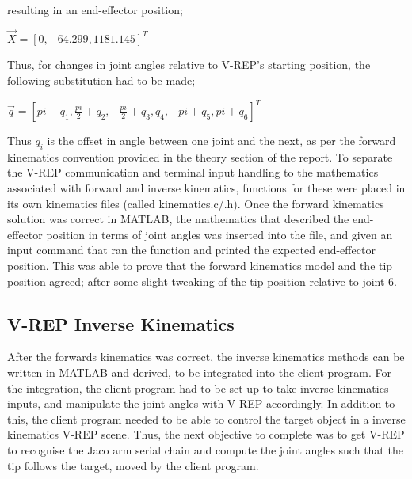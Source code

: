 \documentclass[12pt,openany,a4paper]{book}
\begin{document}
resulting in an end-effector position;

\vspace{\baselineskip}

\begin{center}
$\vec{X} = [0, -64.299, 1181.145]^T$
\end{center}
\vspace{\baselineskip}

Thus, for changes in joint angles relative to V-REP's starting position, the following substitution had to be made;

\vspace{\baselineskip}

\begin{center}
$\vec{q} = [ pi - q_1, \frac{pi}{2} + q_2, -\frac{pi}{2} + q_3, q_4, -pi + q_5, pi + q_6]^T$
\end{center}
\vspace{\baselineskip}

Thus $q_i$ is the offset in angle between one joint and the next, as per the forward kinematics convention provided in the theory section of the report. To separate the V-REP communication and terminal input handling to the mathematics associated with forward and inverse kinematics, functions for these were placed in its own kinematics files (called kinematics.c/.h). Once the forward kinematics solution was correct in MATLAB, the mathematics that described the end-effector position in terms of joint angles was inserted into the file, and given an input command that ran the function and printed the expected end-effector position. This was able to prove that the forward kinematics model and the tip position agreed; after some slight tweaking of the tip position relative to joint 6.


\subsection{V-REP Inverse Kinematics}
After the forwards kinematics was correct, the inverse kinematics methods can be written in MATLAB and derived, to be integrated into the client program. For the integration, the client program had to be set-up to take inverse kinematics inputs, and manipulate the joint angles with V-REP accordingly. In addition to this, the client program needed to be able to control the target object in a inverse kinematics V-REP scene. Thus, the next objective to complete was to get V-REP to recognise the Jaco arm serial chain and compute the joint angles such that the tip follows the target, moved by the client program.
\end{document}
